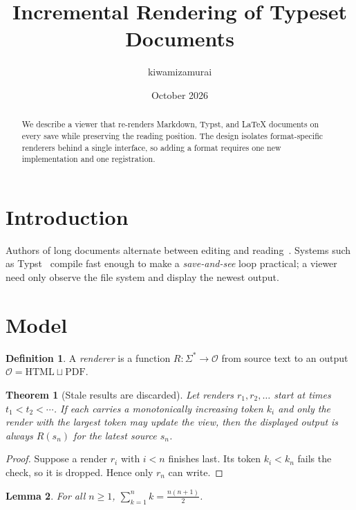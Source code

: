 \documentclass[a4paper,11pt]{article}
\title{Incremental Rendering of Typeset Documents}
\author{kiwamizamurai}
\date{October 2026}
\newtheorem{theorem}{Theorem}
\newtheorem{lemma}[theorem]{Lemma}
\theoremstyle{definition}
\newtheorem{definition}{Definition}
\begin{document}
\maketitle

\begin{abstract}
We describe a viewer that re-renders Markdown, Typst, and \LaTeX{} documents on every save while preserving the reading position. The design isolates format-specific renderers behind a single interface, so adding a format requires one new implementation and one registration.
\end{abstract}

\tableofcontents

\section{Introduction}
Authors of long documents alternate between editing and reading~\cite{knuth1984}. Systems such as Typst~\cite{madje2023} compile fast enough to make a \emph{save-and-see} loop practical; a viewer need only observe the file system and display the newest output.

\section{Model}
\begin{definition}
A \emph{renderer} is a function $R : \Sigma^{*} \to \mathcal{O}$ from source text to an output $\mathcal{O} = \mathrm{HTML} \sqcup \mathrm{PDF}$.
\end{definition}

\begin{theorem}[Stale results are discarded]\label{thm:stale}
Let renders $r_1, r_2, \ldots$ start at times $t_1 < t_2 < \cdots$. If each carries a monotonically increasing token $k_i$ and only the render with the largest token may update the view, then the displayed output is always $R(s_n)$ for the latest source $s_n$.
\end{theorem}
\begin{proof}
Suppose a render $r_i$ with $i < n$ finishes last. Its token $k_i < k_n$ fails the check, so it is dropped. Hence only $r_n$ can write. \qedhere
\end{proof}

\begin{lemma}\label{lem:sum}
For all $n \ge 1$, $\displaystyle\sum_{k=1}^{n} k = \frac{n(n+1)}{2}$.
\end{lemma}
\end{document}
